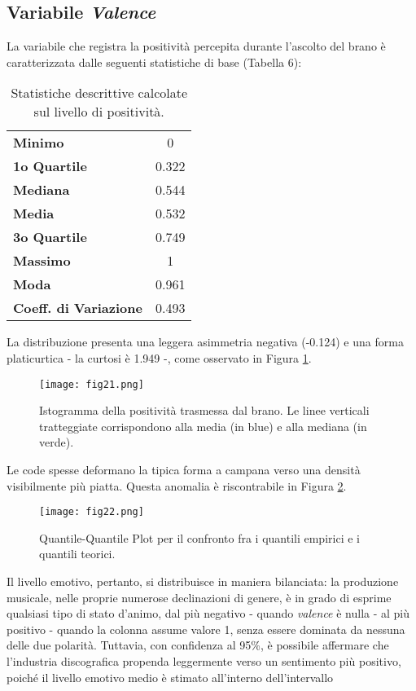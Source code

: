 \documentclass[fleqn,10pt]{SelfArx} %
\begin{document}
\subsection*{Variabile \textit{Valence}}
La variabile che registra la positività percepita durante l'ascolto del brano è caratterizzata dalle seguenti  statistiche di base (Tabella 6):
{\begin{table}[H]
\centering

\begin{tabular}[t]{lc}
\toprule
\midrule
\textbf{Minimo}&0\\
\textbf{1o Quartile}&0.322\\
\textbf{Mediana}&0.544\\
\textbf{Media}&0.532\\
\textbf{3o Quartile}&0.749\\
\textbf{Massimo}&1\\
\textbf{Moda}&0.961\\
\textbf{Coeff. di Variazione}&0.493\\
\bottomrule
\end{tabular}
\caption{Statistiche descrittive calcolate sul livello di positività.}
\end{table}}
La distribuzione presenta una leggera asimmetria negativa (-0.124) e una forma platicurtica - la curtosi è 1.949 -, come osservato in Figura \ref{fig:fig21}. 
\begin{figure}[H]
    \centering
    \texttt{[image: fig21.png]}
    \caption{Istogramma della positività trasmessa dal brano. Le linee verticali tratteggiate corrispondono alla media (in blue) e alla mediana (in verde).}
    \label{fig:fig21}
\end{figure}
Le code spesse deformano la tipica forma a campana verso una densità visibilmente più piatta. Questa anomalia è riscontrabile in Figura \ref{fig:fig22}.
\begin{figure}[H]
    \centering
    \texttt{[image: fig22.png]}
    \caption{Quantile-Quantile Plot per il confronto fra i quantili empirici e i quantili teorici.}
    \label{fig:fig22}
\end{figure}
Il livello emotivo, pertanto, si distribuisce in maniera bilanciata: la produzione musicale, nelle proprie numerose declinazioni di genere, è in grado di esprime qualsiasi tipo di stato d'animo, dal più negativo - quando \textit{valence} è nulla - al più positivo - quando la colonna assume valore 1, senza essere dominata da nessuna delle due polarità. Tuttavia, con confidenza al 95\%, è possibile affermare che l'industria discografica propenda leggermente verso un sentimento più positivo, poiché il livello emotivo medio è stimato all'interno dell'intervallo
\end{document}
